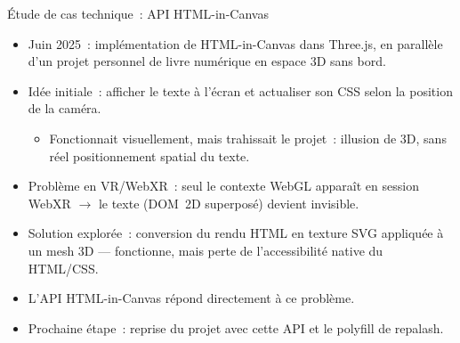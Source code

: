\documentclass[xcolor=monochrome,11pt]{beamer}
\begin{document}
\begin{frame}{Étude de cas technique~: API HTML-in-Canvas}
  \footnotesize
  \begin{itemize}
    \item Juin 2025~: implémentation de HTML-in-Canvas dans Three.js, en
      parallèle d'un projet personnel de livre numérique en espace 3D
      sans bord.
    \item Idée initiale~: afficher le texte à l'écran et actualiser son
      CSS selon la position de la caméra.
      \begin{itemize}
        \footnotesize
        \item Fonctionnait visuellement, mais trahissait le projet~:
          illusion de 3D, sans réel positionnement spatial du texte.
      \end{itemize}
    \item Problème en VR/WebXR~: seul le contexte WebGL apparaît en
      session WebXR $\rightarrow$ le texte (DOM~2D superposé) devient
      invisible.
    \item Solution explorée~: conversion du rendu HTML en texture SVG
      appliquée à un mesh 3D --- fonctionne, mais perte de
      l'accessibilité native du HTML/CSS.
    \item L'API HTML-in-Canvas répond directement à ce problème.
    \item Prochaine étape~: reprise du projet avec cette API et le
      polyfill de repalash.
  \end{itemize}
\end{frame}
\end{document}

